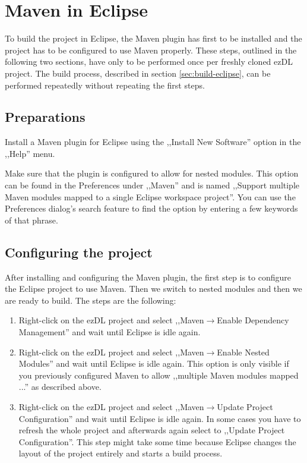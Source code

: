 \documentclass[12pt]{book}
\begin{document}
\section{Maven in Eclipse}

To build the project in Eclipse, the Maven plugin has first to be installed and the project has to be configured to use Maven properly. These steps, outlined in the following two sections, have only to be performed once per freshly cloned ezDL project. The build process, described in section \ref{sec:build-eclipse}, can be performed repeatedly without repeating the first steps.


\subsection{Preparations}

Install a Maven plugin for Eclipse using the ,,Install New Software'' option in the ,,Help'' menu.

Make sure that the plugin is configured to allow for nested modules. This option can be found in the Preferences under ,,Maven'' and is named ,,Support multiple Maven modules mapped to a single Eclipse workspace project''. You can use the Preferences dialog's search feature to find the option by entering a few keywords of that phrase.


\subsection{Configuring the project \label{sub:configuring}}

After installing and configuring the Maven plugin, the first step is to configure the Eclipse project to use Maven. Then we switch to nested modules and then we are ready to build. The steps are the following:

\begin{enumerate}
\item Right-click on the ezDL project and select ,,Maven$\rightarrow$Enable Dependency Management'' and wait until Eclipse is idle again.
\item Right-click on the ezDL project and select ,,Maven$\rightarrow$Enable Nested Modules'' and wait until Eclipse is idle again. This option is only visible if you previously configured Maven to allow ,,multiple Maven modules mapped ...'' as described above.
\item Right-click on the ezDL project and select ,,Maven$\rightarrow$Update Project Configuration'' and wait until Eclipse is idle again. In some cases you have to refresh the whole project and afterwards again select to ,,Update Project Configuration''. This step might take some time because Eclipse changes the layout of the project entirely and starts a build process.
\end{enumerate}
\end{document}

